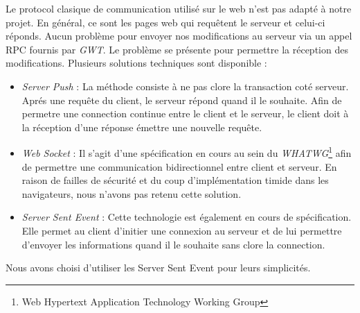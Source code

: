 	Le protocol clasique de communication utilisé sur le web n'est pas 
	adapté à notre projet. En général, ce sont les pages web qui requêtent
	le serveur et celui-ci réponds. Aucun problème pour envoyer nos modifications 
	au serveur via un appel RPC fournis par \emph{GWT}. Le problème se présente
	pour permettre la réception des modifications. Plusieurs solutions 
	techniques sont disponible :
	\begin{itemize}
		\item \emph{Server Push} : La méthode consiste à ne pas clore la
		transaction coté serveur. Aprés une requête du client, le serveur
		répond quand il le souhaite. Afin de permetre une connection continue 
		entre le client et le serveur, le client doit à la réception d'une 
		réponse émettre une nouvelle requête.
		\item \emph{Web Socket}\cite{websocket_spec} : Il s'agit d'une spécification en cours au sein
		du \emph{WHATWG}\footnote{Web Hypertext Application Technology Working 
		Group} afin de permettre une communication bidirectionnel entre client
		et serveur. En raison de failles de sécurité et du coup d'implémentation 
		timide dans les navigateurs, nous n'avons pas retenu cette solution.
		\item \emph{Server Sent Event}\cite{server_sent_spec} 
		\cite{server_sent_html5_rocks} : Cette technologie est également en
		cours de spécification. Elle permet au client d'initier une connexion
		au serveur et de lui permettre d'envoyer les informations quand il
		le souhaite sans clore la connection.
	\end{itemize}
	
	Nous avons choisi d'utiliser les Server Sent Event pour leurs simplicités.
